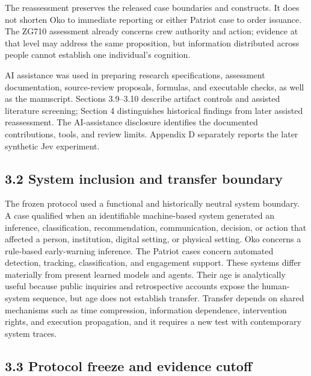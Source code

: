 \documentclass[11pt]{article}
\begin{document}
The reassessment preserves the released case boundaries and constructs. It does not shorten Oko to immediate reporting or either Patriot case to order issuance. The ZG710 assessment already concerns crew authority and action; evidence at that level may address the same proposition, but information distributed across people cannot establish one individual’s cognition.

AI assistance was used in preparing research specifications, assessment documentation, source-review proposals, formulas, and executable checks, as well as the manuscript. Sections 3.9--3.10 describe artifact controls and assisted literature screening; Section 4 distinguishes historical findings from later assisted reassessment. The AI-assistance disclosure identifies the documented contributions, tools, and review limits. Appendix D separately reports the later synthetic Jev experiment.

\subsection*{3.2 System inclusion and transfer boundary}

The frozen protocol used a functional and historically neutral system boundary. A case qualified when an identifiable machine-based system generated an inference, classification, recommendation, communication, decision, or action that affected a person, institution, digital setting, or physical setting. Oko concerns a rule-based early-warning inference. The Patriot cases concern automated detection, tracking, classification, and engagement support. These systems differ materially from present learned models and agents. Their age is analytically useful because public inquiries and retrospective accounts expose the human-system sequence, but age does not establish transfer. Transfer depends on shared mechanisms such as time compression, information dependence, intervention rights, and execution propagation, and it requires a new test with contemporary system traces.

\subsection*{3.3 Protocol freeze and evidence cutoff}
\end{document}
